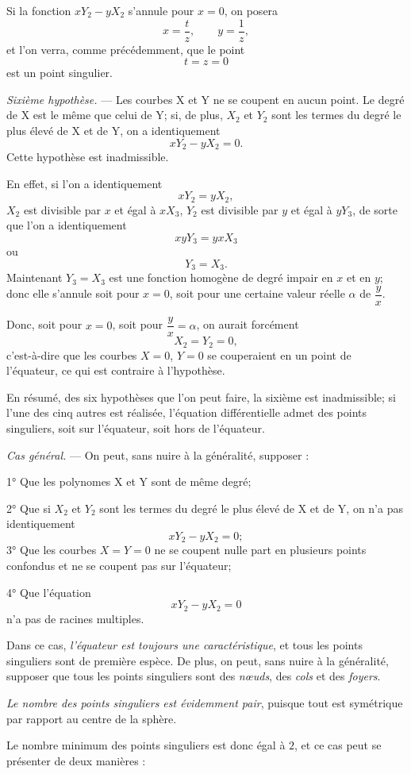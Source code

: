 \documentclass[11pt]{article}
\begin{document}
Si la fonction $xY_2-yX_2$ s’annule pour $x=0$, on posera
\[
x=\frac{t}{z},\qquad y=\frac1z,
\]
et l’on verra, comme précédemment, que le point
\[
t=z=0
\]
est un point singulier.

\emph{Sixième hypothèse.} --- Les courbes X et Y ne se coupent en aucun point. Le degré de X est le même que celui de Y; si, de plus, $X_2$ et $Y_2$ sont les termes du degré le plus élevé de X et de Y, on a identiquement
\[
xY_2-yX_2=0.
\]
Cette hypothèse est inadmissible.

En effet, si l’on a identiquement
\[
xY_2=yX_2,
\]
$X_2$ est divisible par $x$ et égal à $xX_3$, $Y_2$ est divisible par $y$ et égal à $yY_3$, de sorte que l’on a identiquement
\[
xyY_3=yxX_3
\]
ou
\[
Y_3=X_3.
\]
Maintenant $Y_3=X_3$ est une fonction homogène de degré impair en $x$ et en $y$; donc elle s’annule soit pour $x=0$, soit pour une certaine valeur réelle $\alpha$ de $\dfrac yx$.

Donc, soit pour $x=0$, soit pour $\dfrac yx=\alpha$, on aurait forcément
\[
X_2=Y_2=0,
\]
c’est-à-dire que les courbes $X=0$, $Y=0$ se couperaient en un point de l’équateur, ce qui est contraire à l’hypothèse.

En résumé, des six hypothèses que l’on peut faire, la sixième est inadmissible; si l’une des cinq autres est réalisée, l’équation différentielle admet des points singuliers, soit sur l’équateur, soit hors de l’équateur.

\emph{Cas général.} --- On peut, sans nuire à la généralité, supposer :

1° Que les polynomes X et Y sont de même degré;

2° Que si $X_2$ et $Y_2$ sont les termes du degré le plus élevé de X et de Y, on n’a pas identiquement
\[
xY_2-yX_2=0;
\]
3° Que les courbes $X=Y=0$ ne se coupent nulle part en plusieurs points confondus et ne se coupent pas sur l’équateur;

4° Que l’équation
\[
xY_2-yX_2=0
\]
n’a pas de racines multiples.

Dans ce cas, \emph{l’équateur est toujours une caractéristique}, et tous les points singuliers sont de première espèce. De plus, on peut, sans nuire à la généralité, supposer que tous les points singuliers sont des \emph{nœuds}, des \emph{cols} et des \emph{foyers}.

\emph{Le nombre des points singuliers est évidemment pair}, puisque tout est symétrique par rapport au centre de la sphère.

Le nombre minimum des points singuliers est donc égal à $2$, et ce cas peut se présenter de deux manières :
\end{document}
